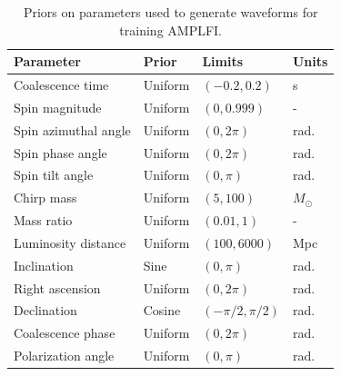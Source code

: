 \begin{table}
\centering
\begin{tabular}{ p{4cm} p{1.5cm} p{1.75cm} p{1.5cm} }
\hline
\hline
Parameter & Prior & Limits & Units\\
\hline
Coalescence time & Uniform & $(-0.2, 0.2)$ & s \\
Spin magnitude & Uniform & $(0, 0.999)$ & - \\
Spin azimuthal angle & Uniform & $(0, 2\pi)$ & rad. \\
Spin phase angle & Uniform & $(0, 2\pi)$ & rad. \\
Spin tilt angle & Uniform & $(0, \pi)$ & rad. \\
Chirp mass & Uniform & $(5, 100)$ & $M_{\odot}$ \\
Mass ratio & Uniform & $(0.01, 1)$ & - \\
Luminosity distance & Uniform & $(100, 6000)$ & Mpc \\
Inclination & Sine & $(0, \pi)$ & rad. \\
Right ascension & Uniform & $(0, 2\pi)$ & rad. \\
Declination & Cosine & $(-\pi/2, \pi/2)$ & rad. \\
Coalescence phase & Uniform & $(0, 2\pi)$ & rad. \\
Polarization angle & Uniform & $(0, \pi)$ & rad. \\
\hline
\hline
\end{tabular}
\caption{Priors on parameters used to generate waveforms for training AMPLFI.}
\label{tab:amplfi-priors}
\end{table}
